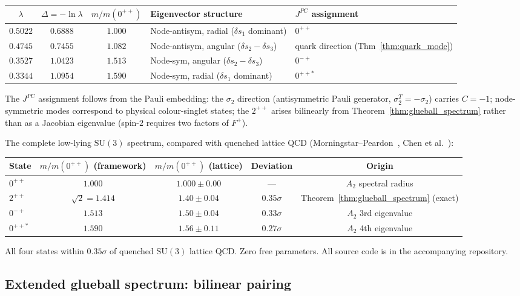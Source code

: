 \documentclass[11pt,a4paper]{article}
\let\hline\midrule
\theoremstyle{definition}
\theoremstyle{remark}
\newcommand{\SU}{\mathrm{SU}}
\begin{document}
\begin{center}
\begin{tabular}{cccll}
\hline
$\lambda$ & $\Delta=-\ln\lambda$ & $m/m(0^{++})$ & Eigenvector structure & $J^{PC}$ assignment \\
\hline
$0.5022$ & $0.6888$ & $1.000$ & Node-antisym, radial ($\delta s_1$ dominant) & $0^{++}$ \\
$0.4745$ & $0.7455$ & $1.082$ & Node-antisym, angular ($\delta s_2-\delta s_3$) & quark direction (Thm~\ref{thm:quark_mode}) \\
$0.3527$ & $1.0423$ & $1.513$ & Node-sym, angular ($\delta s_2-\delta s_3$) & $0^{-+}$ \\
$0.3344$ & $1.0954$ & $1.590$ & Node-sym, radial ($\delta s_1$ dominant) & $0^{++*}$ \\
\hline
\end{tabular}
\end{center}

The $J^{PC}$ assignment follows from the Pauli embedding: the $\sigma_2$ direction (antisymmetric Pauli generator, $\sigma_2^T=-\sigma_2$) carries $C=-1$; node-symmetric modes correspond to physical colour-singlet states; the $2^{++}$ arises bilinearly from Theorem~\ref{thm:glueball_spectrum} rather than as a Jacobian eigenvalue (spin-$2$ requires two factors of $F^+$).

The complete low-lying $\SU(3)$ spectrum, compared with quenched lattice QCD (Morningstar--Peardon~\cite{MP1999}, Chen et al.~\cite{Chen2006}):
\begin{center}
\begin{tabular}{lcccc}
\hline
State & $m/m(0^{++})$ (framework) & $m/m(0^{++})$ (lattice) & Deviation & Origin \\
\hline
$0^{++}$ & $1.000$ & $1.000\pm 0.00$ & --- & $A_2$ spectral radius \\
$2^{++}$ & $\sqrt{2}=1.414$ & $1.40\pm 0.04$ & $0.35\sigma$ & Theorem~\ref{thm:glueball_spectrum} (exact) \\
$0^{-+}$ & $1.513$ & $1.50\pm 0.04$ & $0.33\sigma$ & $A_2$ 3rd eigenvalue \\
$0^{++*}$ & $1.590$ & $1.56\pm 0.11$ & $0.27\sigma$ & $A_2$ 4th eigenvalue \\
\hline
\end{tabular}
\end{center}
All four states within $0.35\sigma$ of quenched $\SU(3)$ lattice QCD. Zero free parameters. All source code is in the accompanying repository.

\subsection{Extended glueball spectrum: bilinear pairing}\label{sec:glueball_extended}
\end{document}
